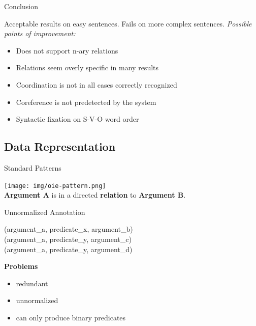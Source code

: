 \documentclass[11pt]{beamer}
\begin{document}
				\begin{frame}{Conclusion}
					\begin{center}
					Acceptable results on easy sentences. Fails on more complex sentences.
					\vspace{15pt}
					\textit{Possible points of improvement:}
						\begin{itemize}
						\item Does not support n-ary relations
						\item Relations seem overly specific in many results
						\item Coordination is not in all cases correctly recognized
						\item Coreference is not predetected by the system 
						\item Syntactic fixation on S-V-O word order
						\end{itemize}
						
					\end{center}
				\end{frame}
	\subsection{Data Representation}
		\begin{frame}{Standard Patterns}
			\begin{center}
				\texttt{[image: img/oie-pattern.png]}\\
				\vspace{15pt}
				\textbf{Argument A} is in a directed \textbf{relation} to \textbf{Argument B}.
			\end{center}
		\end{frame}
		
		\begin{frame}{Unnormalized Annotation}
			\begin{center}
				(argument\_a, predicate\_x, argument\_b)\\
				(argument\_a, predicate\_y, argument\_c)\\
				(argument\_a, predicate\_y, argument\_d)
			\end{center}
			\vspace{15pt}
			\textbf{Problems}\\
			\begin{itemize}
				\item redundant
				\item unnormalized
				\item can only produce binary predicates
			\end{itemize}
		\end{frame}
		
\end{document}
